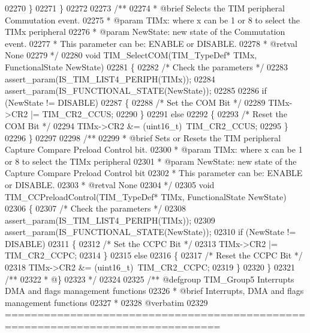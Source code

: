 \begin{DoxyCode}
02270   \}
02271 \}
02272 
02273 \textcolor{comment}{/**}
02274 \textcolor{comment}{  * @brief  Selects the TIM peripheral Commutation event.}
02275 \textcolor{comment}{  * @param  TIMx: where x can be  1 or 8 to select the TIMx peripheral}
02276 \textcolor{comment}{  * @param  NewState: new state of the Commutation event.}
02277 \textcolor{comment}{  *          This parameter can be: ENABLE or DISABLE.}
02278 \textcolor{comment}{  * @retval None}
02279 \textcolor{comment}{  */}
02280 \textcolor{keywordtype}{void} TIM_SelectCOM(TIM\_TypeDef* TIMx, FunctionalState NewState)
02281 \{
02282   \textcolor{comment}{/* Check the parameters */}
02283   assert_param(IS\_TIM\_LIST4\_PERIPH(TIMx));
02284   assert_param(IS\_FUNCTIONAL\_STATE(NewState));
02285 
02286   \textcolor{keywordflow}{if} (NewState != DISABLE)
02287   \{
02288     \textcolor{comment}{/* Set the COM Bit */}
02289     TIMx->CR2 |= TIM_CR2_CCUS;
02290   \}
02291   \textcolor{keywordflow}{else}
02292   \{
02293     \textcolor{comment}{/* Reset the COM Bit */}
02294     TIMx->CR2 &= (uint16\_t)~TIM_CR2_CCUS;
02295   \}
02296 \}
02297 
02298 \textcolor{comment}{/**}
02299 \textcolor{comment}{  * @brief  Sets or Resets the TIM peripheral Capture Compare Preload Control bit.}
02300 \textcolor{comment}{  * @param  TIMx: where x can be  1 or 8 to select the TIMx peripheral}
02301 \textcolor{comment}{  * @param  NewState: new state of the Capture Compare Preload Control bit}
02302 \textcolor{comment}{  *          This parameter can be: ENABLE or DISABLE.}
02303 \textcolor{comment}{  * @retval None}
02304 \textcolor{comment}{  */}
02305 \textcolor{keywordtype}{void} TIM_CCPreloadControl(TIM\_TypeDef* TIMx, FunctionalState NewState)
02306 \{
02307   \textcolor{comment}{/* Check the parameters */}
02308   assert_param(IS\_TIM\_LIST4\_PERIPH(TIMx));
02309   assert_param(IS\_FUNCTIONAL\_STATE(NewState));
02310   \textcolor{keywordflow}{if} (NewState != DISABLE)
02311   \{
02312     \textcolor{comment}{/* Set the CCPC Bit */}
02313     TIMx->CR2 |= TIM_CR2_CCPC;
02314   \}
02315   \textcolor{keywordflow}{else}
02316   \{
02317     \textcolor{comment}{/* Reset the CCPC Bit */}
02318     TIMx->CR2 &= (uint16\_t)~TIM_CR2_CCPC;
02319   \}
02320 \}
02321 \textcolor{comment}{/**}
02322 \textcolor{comment}{  * @\}}
02323 \textcolor{comment}{  */}
02324 
02325 \textcolor{comment}{/** @defgroup TIM\_Group5 Interrupts DMA and flags management functions}
02326 \textcolor{comment}{ *  @brief    Interrupts, DMA and flags management functions }
02327 \textcolor{comment}{ *}
02328 \textcolor{comment}{@verbatim   }
02329 \textcolor{comment}{ ===============================================================================}

\end{DoxyCode}
